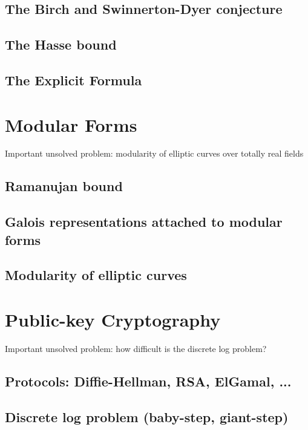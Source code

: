 \documentclass{book}
\theoremstyle{plain}
\theoremstyle{definition}
\numberwithin{equation}{section}
\numberwithin{figure}{section}
\numberwithin{table}{section}
\begin{document}
\section{The Birch and Swinnerton-Dyer conjecture}
\section{The Hasse bound}
\section{The Explicit Formula}



\chapter{Modular Forms}
Important unsolved problem: modularity of elliptic curves
over totally real fields

\section{Ramanujan bound}
\section{Galois representations attached to modular forms}
\section{Modularity of elliptic curves}




\chapter{Public-key Cryptography}

Important unsolved problem: how difficult is the discrete log problem?

\section{Protocols: Diffie-Hellman, RSA, ElGamal, ...}
\section{Discrete log problem (baby-step, giant-step)}




\end{document}
